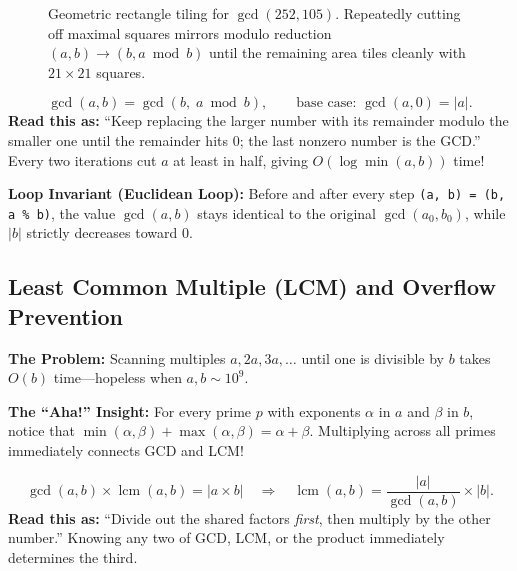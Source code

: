 \documentclass[11pt,a4paper]{article}
\theoremstyle{definition}
\newcommand{\painbeat}{\textbf{\color{accentamber}The Problem:} }
\newcommand{\ahabeat}{\textbf{\color{accentteal}The ``Aha!'' Insight:} }
\newcommand{\invariantbeat}[1]{\par\noindent\textbf{\color{accentteal}Loop Invariant (#1):} }
\begin{document}
\begin{figure}[htbp]
\caption{Geometric rectangle tiling for $\gcd(252, 105)$. Repeatedly cutting off maximal squares mirrors modulo reduction $(a, b) \to (b, a \bmod b)$ until the remaining area tiles cleanly with $21 \times 21$ squares.}
\label{fig:euclid-tiling}
\end{figure}

\begin{formulabox}
\[
    \gcd(a, b) = \gcd(b,\; a \bmod b), \qquad \text{base case: } \gcd(a, 0) = |a|.
\]
\textbf{Read this as:} ``Keep replacing the larger number with its remainder modulo the smaller one until the remainder hits $0$; the last nonzero number is the GCD.'' Every two iterations cut $a$ at least in half, giving $O(\log \min(a, b))$ time!
\end{formulabox}

\invariantbeat{Euclidean Loop} Before and after every step \texttt{(a, b) = (b, a \% b)}, the value $\gcd(a, b)$ stays identical to the original $\gcd(a_0, b_0)$, while $|b|$ strictly decreases toward $0$.

\subsection{Least Common Multiple (LCM) and Overflow Prevention}

\painbeat Scanning multiples $a, 2a, 3a, \dots$ until one is divisible by $b$ takes $O(b)$ time---hopeless when $a, b \sim 10^9$.

\ahabeat For every prime $p$ with exponents $\alpha$ in $a$ and $\beta$ in $b$, notice that $\min(\alpha, \beta) + \max(\alpha, \beta) = \alpha + \beta$. Multiplying across all primes immediately connects GCD and LCM!

\begin{formulabox}
\[
    \gcd(a, b) \times \operatorname{lcm}(a, b) = |a \times b|
    \quad \Longrightarrow \quad
    \operatorname{lcm}(a, b) = \frac{|a|}{\gcd(a, b)} \times |b|.
\]
\textbf{Read this as:} ``Divide out the shared factors \emph{first}, then multiply by the other number.'' Knowing any two of GCD, LCM, or the product immediately determines the third.
\end{formulabox}
\end{document}
